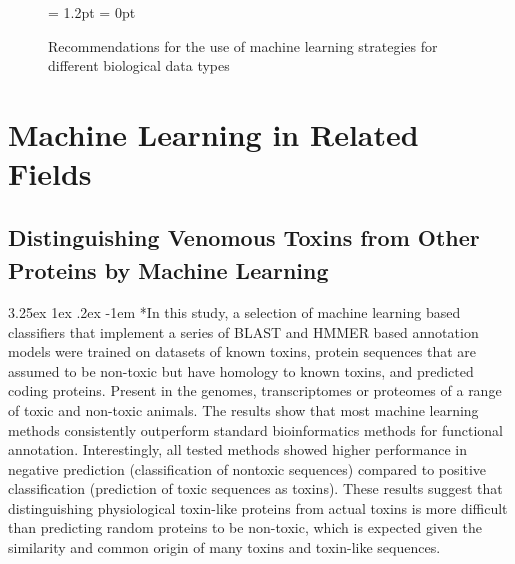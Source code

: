 \documentclass{article}
\makeatletter
\renewcommand\paragraph{\@startsection{paragraph}{4}{\z@}%
	{3.25ex \@plus1ex \@minus.2ex}%
	{-1em}%
	{\normalfont\normalsize}}
\makeatother
\begin{document}
		\begin{figure}[hbtp]
			\centering
			\fboxrule = 1.2pt
			\fboxsep = 0pt
			\caption{Recommendations for the use of machine learning strategies for different biological data types}
		\end{figure}
		
		\section*{Machine Learning in Related Fields}
		
		\subsection*{Distinguishing Venomous Toxins from Other Proteins by Machine Learning\textsuperscript{\cite{ref6}}}
		
		\paragraph*{In this study, a selection of machine learning based classifiers that implement a series of BLAST and HMMER based annotation models were trained on datasets of known toxins, protein sequences that are assumed to be non-toxic but have homology to known toxins, and predicted coding proteins. Present in the genomes, transcriptomes or proteomes of a range of toxic and non-toxic animals. The results show that most machine learning methods consistently outperform standard bioinformatics methods for functional annotation. Interestingly, all tested methods showed higher performance in negative prediction (classification of nontoxic sequences) compared to positive classification (prediction of toxic sequences as toxins). These results suggest that distinguishing physiological toxin-like proteins from actual toxins is more difficult than predicting random proteins to be non-toxic, which is expected given the similarity and common origin of many toxins and toxin-like sequences.}
		
\end{document}

